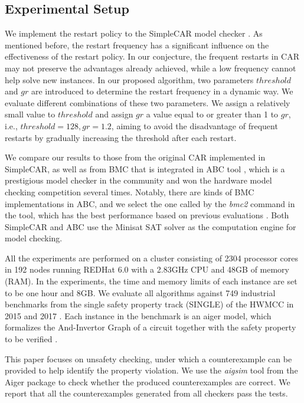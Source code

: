 \subsection{Experimental Setup}
We implement the restart policy to the SimpleCAR model checker \cite{simplecar}. As mentioned before, the restart frequency has a significant influence on the effectiveness of the restart policy. In our conjecture, the frequent restarts in CAR may not preserve the advantages already achieved, while a low frequency cannot help solve new instances. In our proposed algorithm, two parameters $threshold$ and $gr$ are introduced to determine the restart frequency in a dynamic way. We evaluate different combinations of these two parameters. We assign a relatively small value to $threshold$ and assign $gr$ a value equal to or greater than 1 to $gr$, i.e., $threshold = 128, gr = 1.2$, aiming to avoid the disadvantage of frequent restarts by gradually increasing the threshold after each restart. 

We compare our results to those from the original CAR implemented in SimpleCAR, as well as from BMC that is integrated in ABC tool \cite{BM10}, which is a prestigious model checker in the community and won the hardware model checking competition several times. Notably, there are kinds of BMC implementations in ABC, and we select the one called by the \emph{bmc2} command in the tool, which has the best performance based on previous evaluations \cite{LDPRV18}. Both SimpleCAR and ABC use the Minisat SAT solver \cite{minisat,ES04} as the computation engine for model checking. 

All the experiments are performed on a cluster consisting of 2304 processor cores in 192 nodes running REDHat 6.0 with a 2.83GHz CPU and 48GB of memory (RAM). In the experiments, the time and memory limits of each instance are set to be one hour and 8GB.
We evaluate all algorithms against 749 industrial benchmarks from the single safety property track (SINGLE) of the HWMCC in 2015 \cite{hwmcc15} and 2017 \cite{hwmcc17}. Each instance in the benchmark is an aiger model, which formalizes the And-Invertor Graph  of a circuit together with the safety property to be verified \cite{aiger}. 

This paper focuses on unsafety checking, under which a counterexample can be provided to help identify the property violation. We use the \emph{aigsim} tool from the Aiger package \cite{aigertools} to check whether the produced counterexamples are correct. We report that all the counterexamples generated from all checkers pass the tests.

